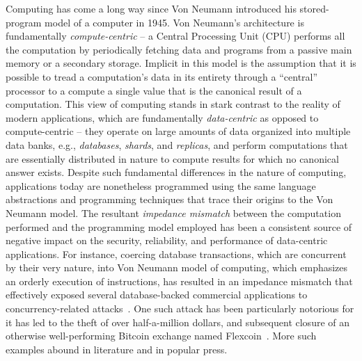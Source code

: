 Computing has come a long way since Von Neumann introduced his
stored-program model of a computer in 1945. Von Neumann's architecture
is fundamentally \emph{compute-centric} -- a Central Processing Unit
(CPU) performs all the computation by periodically fetching data and
programs from a passive main memory or a secondary storage. Implicit
in this model is the assumption that it is possible to tread a
computation's data in its entirety through a ``central'' processor to
a compute a single value that is the canonical result of a
computation. This view of computing stands in stark contrast to the
reality of modern applications, which are fundamentally
\emph{data-centric} as opposed to compute-centric -- they operate on
large amounts of data organized into multiple data banks, e.g.,
\emph{databases}, \emph{shards}, and \emph{replicas}, and perform
computations that are essentially distributed in nature to compute
results for which no canonical answer exists. Despite such fundamental
differences in the nature of computing, applications today are
nonetheless programmed using the same language abstractions and
programming techniques that trace their origins to the Von Neumann
model. The resultant \emph{impedance mismatch} between the computation
performed and the programming model employed has been a consistent
source of negative impact on the security, reliability, and
performance of data-centric applications. For instance, coercing
database transactions, which are concurrent by their very nature, into
Von Neumann model of computing, which emphasizes an orderly
execution of instructions, has resulted in an impedance mismatch that
effectively exposed several database-backed commercial applications
to concurrency-related attacks~\cite{acidrain}. One such attack has
been particularly notorious for it has led to the theft of over
half-a-million dollars, and subsequent closure of an otherwise
well-performing Bitcoin exchange named Flexcoin~\cite{poloniexbug}.
More such examples abound in literature and in popular press.


